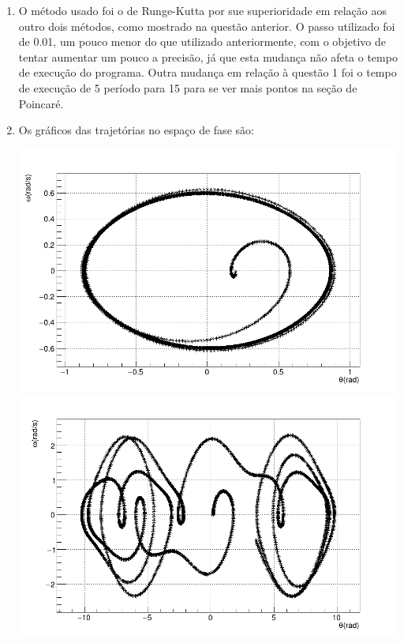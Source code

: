 \documentclass[main.tex]{subfiles}
\begin{document}
\begin{enumerate}[label=\textbf{\alph*)}]
    \item O método usado foi o de Runge-Kutta por sue superioridade em relação aos outro dois métodos, como mostrado na questão anterior. O passo utilizado foi de 0.01, um pouco menor do que utilizado anteriormente, com o objetivo de
    tentar aumentar um pouco a precisão, já que esta mudança não afeta o tempo de execução do programa. Outra mudança em relação à questão 1 foi o tempo de execução de 5 período para 15 para se ver mais pontos na seção de Poincaré.
    \item Os gráficos das trajetórias no espaço de fase são:
    \begin{center}
        \includegraphics[scale=0.15]{../q2/alpha0.5/plots/theta_omega_RK.png}
        \includegraphics[scale=0.15]{../q2/alpha1.2/plots/theta_omega_RK.png}

\end{center}
\end{enumerate}
\end{document}
